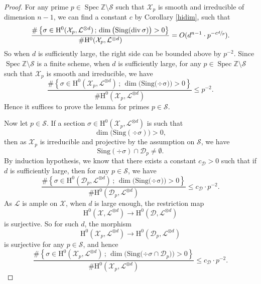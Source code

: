 \documentclass[11pt]{article}
\numberwithin{equation}{section}
\newcommand{\sep}{\,;\,}
\theoremstyle{plain}
\theoremstyle{definition}
\newcommand{\ho}{\mathrm{H}}
\newcommand{\X}{\mathcal{X}}
\newcommand{\li}{\mathcal{L}}
\newcommand{\Z}{\mathbb{Z}}
\DeclareMathOperator{\Spec}{Spec}
\begin{document}
\begin{proof}
For any prime $p\in \Spec \Z\setminus\mathcal{S}$ such that $\X_p$ is smooth and irreducible of dimension $n-1$, we can find a constant $c$ by Corollary \ref{hidim}, such that
\[
\frac{\#\left\{ \sigma\in \ho^0(\X_p, \li^{\otimes d})\sep \dim\big(\mathrm{Sing(\div \sigma})\big)>0 \right\}}{\#\ho^0(\X_p, \li^{\otimes d})}=O(d^{n-1}\cdot p^{-c\sfrac{d}{p}}).
\]
So when $d$ is sufficiently large, the right side can be bounded above by $p^{-2}$. Since $\Spec \Z\setminus\mathcal{S}$ is a finite scheme, when $d$ is sufficiently large, for any $p\in \Spec \Z\setminus\mathcal{S}$ such that $\X_p$ is smooth and irreducible, we have
\[
\frac{\#\left\{ \sigma\in \ho^0(\X_p, \li^{\otimes d})\sep \dim\big(\mathrm{Sing(\div \sigma})\big)>0 \right\}}{\#\ho^0(\X_p, \li^{\otimes d})}\leq p^{-2}.
\]
Hence it suffices to prove the lemma for primes $p\in \mathcal{S}$.


Now let $p\in \mathcal{S}$. If a section $\sigma\in \ho^0(\X_p, \li^{\otimes d})$ is such that
\[
\dim\big(\mathrm{Sing}(\div \sigma) \big)>0,
\]
then as $\X_p$ is irreducible and projective by the assumption on $\mathcal{S}$, we have
\[
\mathrm{Sing}(\div \sigma)\cap \mathcal{D}_p\not=\emptyset.
\]
By induction hypothesis, we know that there exists a constant $c_\mathcal{D}>0$ such that if $d$ is sufficiently large, then for any $p\in \mathcal{S}$, we have
\[
\frac{\#\left\{ \sigma\in \ho^0(\mathcal{D}_p, \li^{\otimes d})\sep \dim\big(\mathrm{Sing(\div \sigma})\big)>0 \right\}}{\#\ho^0(\mathcal{D}_p, \li^{\otimes d})}\leq c_\mathcal{D}\cdot p^{-2}.
\]
As $\li$ is ample on $\X$, when $d$ is large enough, the restriction map
\[
\ho^0(\X, \li^{\otimes d}) \to \ho^0(\mathcal{D}, \li^{\otimes d})
\]
is surjective. So for such $d$, the morphism
\[
\ho^0(\X_p, \li^{\otimes d}) \to \ho^0(\mathcal{D}_p, \li^{\otimes d})
\]
is surjective for any $p\in \mathcal{S}$, and hence
\[
\frac{\#\left\{ \sigma\in \ho^0(\X_p, \li^{\otimes d})\sep \dim\big(\mathrm{Sing(\div }\sigma\cap \mathcal{D}_p)\big)>0 \right\}}{\#\ho^0(\X_p, \li^{\otimes d})}\leq c_\mathcal{D}\cdot p^{-2}.
\]


\end{proof}
\end{document}
